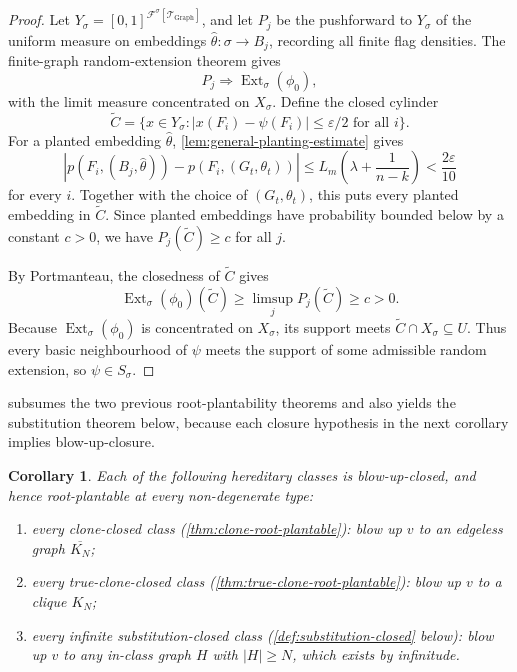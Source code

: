 \documentclass[11pt]{article}
\newtheorem{corollary}[corollary]{Corollary}
\theoremstyle{definition}
\newcommand{\F}{\mathcal{F}}
\newcommand{\T}{\mathcal{T}}
\newcommand{\Ext}{\operatorname{Ext}}
\newcommand{\eps}{\varepsilon}
\begin{document}
\begin{proof}
Let $Y_\sigma=[0,1]^{\F^\sigma[\T_{\mathrm{Graph}}]}$, and let $P_j$ be the pushforward
to $Y_\sigma$ of the uniform measure on embeddings
$\widehat\theta:\sigma\to B_j$, recording all finite flag densities.  The finite-graph
random-extension theorem gives
\[
  P_j\Rightarrow \Ext_\sigma(\phi_0),
\]
with the limit measure concentrated on $X_\sigma$.  Define the closed cylinder
\[
  \widetilde C=
  \{x\in Y_\sigma:
    |x(F_i)-\psi(F_i)|\le\eps/2\text{ for all }i\}.
\]
For a planted embedding $\widehat\theta$, \cref{lem:general-planting-estimate} gives
\[
  |p(F_i,(B_j,\widehat\theta))-p(F_i,(G_t,\theta_t))|
  \le L_m\left(\lambda+\frac1{n-k}\right)<\frac{2\eps}{10}
\]
for every $i$.  Together with the choice of $(G_t,\theta_t)$, this puts every planted
embedding in $\widetilde C$.  Since planted embeddings have probability bounded below by a
constant $c>0$, we have $P_j(\widetilde C)\ge c$ for all $j$.

By Portmanteau, the closedness of $\widetilde C$ gives
\[
  \Ext_\sigma(\phi_0)(\widetilde C)\ge\limsup_j P_j(\widetilde C)\ge c>0.
\]
Because $\Ext_\sigma(\phi_0)$ is concentrated on $X_\sigma$, its support meets
$\widetilde C\cap X_\sigma\subseteq U$.  Thus every basic neighbourhood of $\psi$ meets
the support of some admissible random extension, so $\psi\in S_\sigma$.
\end{proof}

 subsumes the two previous root-plantability theorems and
also yields the substitution theorem below, because each closure hypothesis in the next
corollary implies blow-up-closure.

\begin{corollary}\label{cor:closures-imply-blowup}
Each of the following hereditary classes is blow-up-closed, and hence root-plantable at
every non-degenerate type:
\begin{enumerate}
\item every clone-closed class (\cref{thm:clone-root-plantable}): blow up $v$ to an
  edgeless graph $\overline{K_N}$;
\item every true-clone-closed class (\cref{thm:true-clone-root-plantable}): blow up $v$
  to a clique $K_N$;
\item every infinite substitution-closed class (\cref{def:substitution-closed} below):
  blow up $v$ to any in-class graph $H$ with $|H|\ge N$, which exists by infinitude.
\end{enumerate}
\end{corollary}
\end{document}
